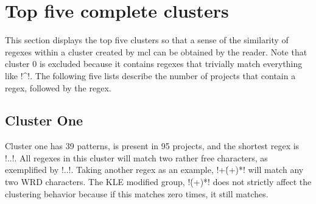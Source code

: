 \section*{Top five complete clusters}
\label{app:top5CompleteClusters}

This section displays the top five clusters so that a sense of the similarity of regexes within a cluster created by mcl can be obtained by the reader.  Note that cluster 0 is excluded because it contains regexes that trivially match everything like \cverb!^!.  The following five lists describe the number of projects that contain a regex, followed by the regex.

\subsection*{Cluster One}
Cluster one has 39 patterns, is present in 95 projects, and the shortest regex is \cverb!..!.  All regexes in this cluster will match two rather free characters, as exemplified by \cverb!..!.  Taking another regex as an example, \cverb!\w+(\.\w+)*! will match any two WRD characters.  The KLE modified group, \cverb!(\.\w+)*! does not strictly affect the clustering behavior because if this matches zero times, it still matches.
